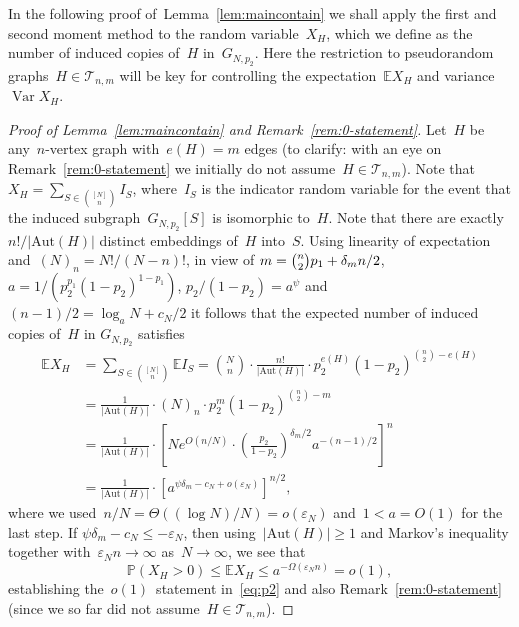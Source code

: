 \documentclass{article}
\newcommand{\eps}{\varepsilon}
\renewcommand{\Pr}{\mathbb{P}}
\newcommand{\E}{\mathbb{E}}
\newcommand{\cT}{\mathcal{T}}
\newcommand\lrpar[1]{\left(#1\right)}
\newcommand\abs[1]{\left|#1\right|}
\newcommand\Var{\operatorname{Var}}
\newcommand{\Aut}{\mathrm{Aut}}
\newcommand\lrsqpar[1]{\left[#1\right]}
\newcommand{\refL}[1]{Lemma~\ref{#1}}
\begin{document}
In the following proof of~\refL{lem:maincontain} we shall apply the first and second moment method to the random variable~$X_H$, 
which we define as the number of induced copies of~$H$ in~$G_{N,p_2}$. 
Here the restriction to pseudorandom graphs~$H \in \cT_{n,m}$ will be key for controlling the expectation~$\E X_H$ and variance~$\Var X_H$.  
\begin{proof}[Proof of \refL{lem:maincontain} and Remark~\ref{rem:0-statement}]
Let~$H$ be any~$n$-vertex graph with~$e(H)=m$ edges (to clarify: with an eye on Remark~\ref{rem:0-statement} we initially do not assume~$H \in \cT_{n,m}$). 
Note that ${X_H=\sum_{S\in \binom{[N]}{n}} I_S}$, where~$I_S$ is the indicator random variable for the event that the induced subgraph~$G_{N,p_2}[S]$ is isomorphic to~$H$. 
Note that there are exactly $n!/\abs{\Aut(H)}$ distinct embeddings of~$H$ into~$S$. 
Using linearity of expectation and~$(N)_n=N!/(N-n)!$, 
in view of $m=\tbinom{n}{2}p_1+\delta_m n/2$, $a = {1/(p_2^{p_1}(1-p_2)^{1-p_1})}$, $p_2/(1-p_2) = a^{\psi}$ and~$(n-1)/2 = \log_a N + c_N/2$ it follows that the expected number of induced copies of~$H$ in $G_{N,p_2}$ satisfies
\begin{equation}\label{eq:firstmomentXH}
\begin{split}
\E X_H &= \sum_{S\in \binom{[N]}{n}} \E I_S = 
\binom{N}{n} \cdot \frac{n!}{\abs{\Aut(H)}}  \cdot p_2^{e(H)}(1-p_2)^{\binom{n}{2}-e(H)}\\
&= \frac{1}{\abs{\Aut(H)}} \cdot (N)_n \cdot p_2^m(1-p_2)^{\binom{n}{2}-m} \\
&= \frac{1}{\abs{\Aut(H)}} \cdot \lrsqpar{Ne^{O(n/N)} \cdot \lrpar{\frac{p_2}{1-p_2}}^{\delta_m/2}a^{-(n-1)/2}}^n \\
& =\frac{1}{\abs{\Aut(H)}} \cdot \lrsqpar{a^{\psi\delta_m-c_N+o(\eps_N)}}^{n/2} ,
\end{split}
\end{equation}
where we used~$n/N=\Theta((\log N)/N) = o(\eps_N)$ and~$1 < a = O(1)$ for the last step. 
If ${\psi\delta_m - c_N \leq - \eps_N}$, then using~${|\Aut(H)| \ge 1}$ and Markov's inequality together with~${\eps_N n \to \infty}$ as~${N \to \infty}$, we see that 
\[\Pr(X_H>0)  \le \E X_H \le a^{-\Omega(\eps_N n)} = o(1),
\]
establishing the~\mbox{$o(1)$ statement} in~\eqref{eq:p2} and also Remark~\ref{rem:0-statement} (since we so far did not assume~$H \in \cT_{n,m}$). 


\end{proof}
\end{document}
